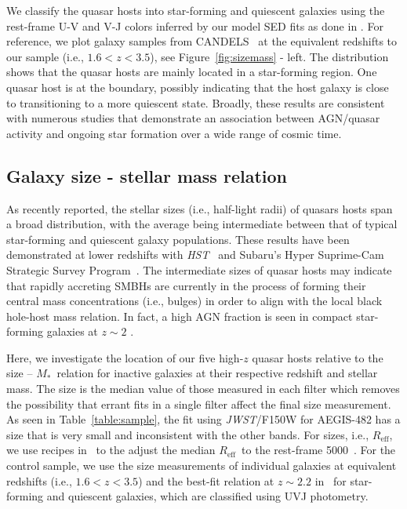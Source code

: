 \documentclass[twocolumn]{aastex631}
\newcommand{\reff}{{$R_{\mathrm{eff}}$}}
\newcommand{\smass}{{$M_*$}}
\newcommand{\hst}{{\it HST}}
\newcommand{\jwst}{{\it JWST}}
\newcommand{\angstrom}{\text{\normalfont\AA}}
\begin{document}
We classify the quasar hosts into star-forming and quiescent galaxies using the rest-frame U-V and V-J colors inferred by our model SED fits as done in \citet{vdW+2014}. For reference, we plot galaxy samples from CANDELS~\citep{vdW+2012, vdW+2014} at the equivalent redshifts to our sample (i.e., $1.6<z<3.5$), see Figure~\ref{fig:sizemass} - left. The distribution shows that the quasar hosts are mainly located in a star-forming region. One quasar host is at the boundary, possibly indicating that the host galaxy is close to transitioning to a more quiescent state. Broadly, these results are consistent with numerous studies that demonstrate an association between AGN/quasar activity and ongoing star formation over a wide range of cosmic time.

\subsection{Galaxy size - stellar mass relation}

As recently reported, the stellar sizes (i.e., half-light radii) of quasars hosts span a broad distribution, with the average being intermediate between that of typical star-forming and quiescent galaxy populations. These results have been demonstrated at lower redshifts with \hst~\citep[$z\sim1.5$,][]{Silverman2019} and Subaru's Hyper Suprime-Cam Strategic Survey Program~\citep[$z < 1$,][]{Li2021}. The intermediate sizes of quasar hosts may indicate that rapidly accreting SMBHs are currently in the process of forming their central mass concentrations (i.e., bulges) in order to align with the local black hole-host mass relation. In fact, a high AGN fraction is seen in compact star-forming galaxies at $z\sim2$ \citep{Kocevski2017}.

Here, we investigate the location of our five high-$z$ quasar hosts relative to the size -- \smass\ relation for inactive galaxies at their respective redshift and stellar mass. The size is the median value of those measured in each filter which removes the possibility that errant fits in a single filter affect the final size measurement. As seen in Table~\ref{table:sample}, the fit using \jwst/F150W for AEGIS-482 has a size that is very small and inconsistent with the other bands. For sizes, i.e., \reff, we use recipes in~\citet{vdW+2014} to the adjust the median \reff\ to the rest-frame 5000~\angstrom. For the control sample, we use the size measurements of individual galaxies at equivalent redshifts (i.e., $1.6<z<3.5$) and the best-fit relation at $z\sim2.2$ in~\citet{vdW+2014} for star-forming and quiescent galaxies, which are classified using UVJ photometry. 
\end{document}
